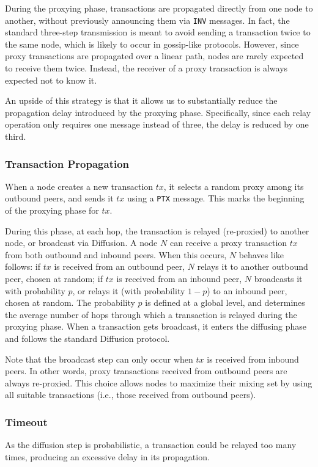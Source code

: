 \documentclass{article}
\begin{document}
	During the proxying phase, transactions are propagated directly from one node to another, without previously announcing them via \texttt{INV} messages.
	In fact, the standard three-step transmission is meant to avoid sending a transaction twice to the same node, which is likely to occur in gossip-like protocols.
	However, since proxy transactions are propagated over a linear path, nodes are rarely expected to receive them twice.
	Instead, the receiver of a proxy transaction is always expected not to know it.
	
	An upside of this strategy is that it allows us to substantially reduce the propagation delay introduced by the proxying phase.
	Specifically, since each relay operation only requires one message instead of three, the delay is reduced by one third.
	
	\subsubsection{Transaction Propagation}
	When a node creates a new transaction $tx$, it selects a random proxy among its outbound peers, and sends it $tx$ using a \texttt{PTX} message.
	This marks the beginning of the proxying phase for $tx$.
	
	During this phase, at each hop, the transaction is relayed (re-proxied) to another node, or broadcast via Diffusion.
	A node $N$ can receive a proxy transaction $tx$ from both outbound and inbound peers.
	When this occurs, $N$ behaves like follows:
	if $tx$ is received from an outbound peer, $N$ relays it to another outbound peer, chosen at random;
	if $tx$ is received from an inbound peer, $N$ broadcasts it with probability $p$, or relays it (with probability $1{-}p$) to an inbound peer, chosen at random.
	The probability $p$ is defined at a global level, and determines the average number of hops through which a transaction is relayed during the proxying phase.
	When a transaction gets broadcast, it enters the diffusing phase and follows the standard Diffusion protocol.
	
	Note that the broadcast step can only occur when $tx$ is received from inbound peers.
	In other words, proxy transactions received from outbound peers are always re-proxied.
	This choice allows nodes to maximize their mixing set by using all suitable transactions (i.e., those received from outbound peers).
	
	\subsubsection{Timeout}
	As the diffusion step is probabilistic, a transaction could be relayed too many times, producing an excessive delay in its propagation.
	
\end{document}
